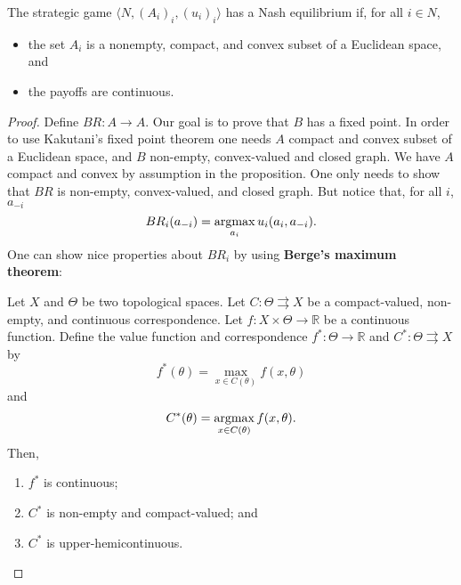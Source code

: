\documentclass[../../main.tex]{subfiles}
\begin{document}
    \begin{myprop}
        The strategic game $\langle N, (A_i)_i, (u_i)_i\rangle$ has a Nash equilibrium if, for all $i\in N$,
        \begin{itemize}
            \item the set $A_i$ is a nonempty, compact, and convex subset of a Euclidean space, and
            \item the payoffs are continuous.
        \end{itemize}
    \end{myprop}   
    \begin{proof}
        Define $BR\colon A\to A$. Our goal is to prove that $B$ has a fixed point. In order to use Kakutani's fixed point theorem one needs $A$ compact and convex subset of a Euclidean space, and $B$ non-empty, convex-valued and closed graph. We have $A$ compact and convex by assumption in the proposition. One only needs to show that $BR$ is non-empty, convex-valued, and closed graph. But notice that, for all $i$, $a_{-i}$
        \[
            BR_i(a_{-i}) = \operatorname*{argmax}_{a_i} u_i(a_i,a_{-i}).
        \]
        One can show nice properties about $BR_i$ by using \textbf{Berge's maximum theorem}:
        \begin{mylem}
            Let $X$ and $\Theta$ be two topological spaces. Let $C\colon \Theta\rightrightarrows X$ be a compact-valued, non-empty, and continuous correspondence. Let $f\colon X\times \Theta\to\mathbb{R}$ be a continuous function. Define the value function and correspondence $f^*\colon\Theta\to\mathbb{R}$ and $C^*\colon\Theta\rightrightarrows X$ by
            \[
                f^*(\theta) = \max_{x\in C(\theta)}f(x,\theta)
            \]
            and
            \[
                C^*(\theta) = \operatorname*{argmax}_{x\in C(\theta)}f(x,\theta).
            \]
            Then,
            \begin{enumerate}
                \item $f^*$ is continuous;
                \item $C^*$ is non-empty and compact-valued; and
                \item $C^*$ is upper-hemicontinuous.
            \end{enumerate}
        \end{mylem}
    \end{proof}
\end{document}
